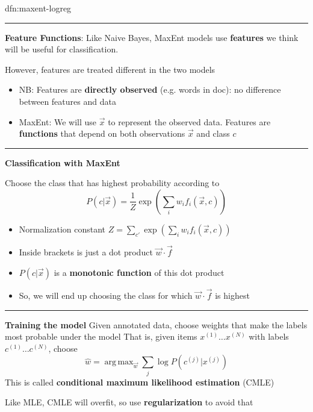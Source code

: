 \documentclass[landscape, 8pt]{extarticle}
\DeclareMathOperator*{\argmax}{arg\,max}
\begin{document}
\begin{multicols}{3}
\begin{dfn}{dfn:maxent-logreg}{}
    \vspace{-10pt}
    \noindent\rule{\textwidth}{0.2pt}
    \textbf{Feature Functions}: Like Naive Bayes, MaxEnt models use \textbf{features} we think will be useful for classification.

    However, features are treated different in the two models
    \vspace{-5pt}
    \begin{itemize}
        \setlength\itemsep{0em}
        \item NB: Features are \textbf{directly observed} (e.g. words in doc): no difference between features and data
        \item MaxEnt: We will use $\vec{x}$ to represent the observed data. Features are \textbf{functions} that depend on both observations $\vec{x}$ and class $c$
    \end{itemize}

    \vspace{-10pt}
    \noindent\rule{\textwidth}{0.2pt}
    \textbf{Classification with MaxEnt}
    
    Choose the class that has highest probability according to
    \[P(c | \vec{x}) = \frac{1}{Z} \exp\left(\sum_{i}w_{i}f_{i}(\vec{x}, c)\right)\]
    \begin{itemize}
        \setlength\itemsep{0em}
        \item Normalization constant $Z = \sum_{c'}\exp(\sum_{i}w_{i}f_{i}(\vec{x},c))$
        \item Inside brackets is just a dot product $\vec{w} \cdot \vec{f}$
        \item $P(c|\vec{x})$ is a \textbf{monotonic function} of this dot product
        \item So, we will end up choosing the class for which $\vec{w} \cdot \vec{f}$ is highest
    \end{itemize}

    \vspace{-10pt}
    \noindent\rule{\textwidth}{0.2pt}
    \textbf{Training the model}
    Given annotated data, choose weights that make the labels most probable under the model
    That is, given items $x^{(1)}\dots x^{(N)}$ with labels $c^{(1)}\dots c^{(N)}$, choose
    \[\hat{w} = \argmax_{\vec{w}} \sum_{j} \log P(c^{(j)} | x^{(j)})\]
    This is called \textbf{conditional maximum likelihood estimation} (CMLE)

    Like MLE, CMLE will overfit, so use \textbf{regularization} to avoid that

\end{dfn}



\end{multicols}
\end{document}
